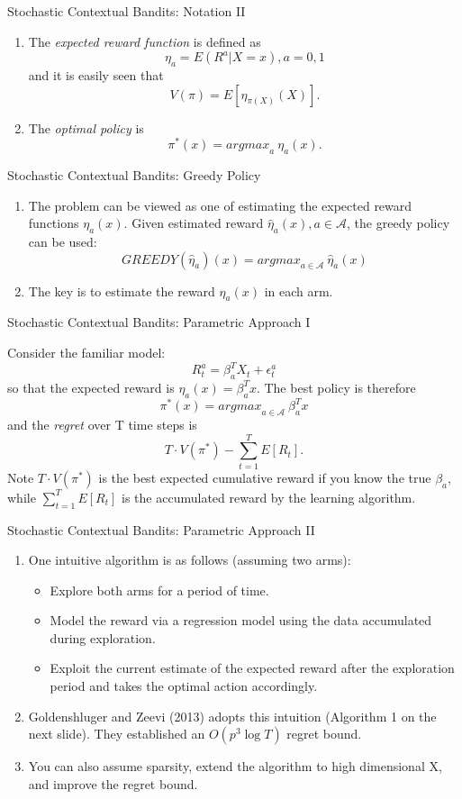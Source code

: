 \documentclass[english]{article}
\begin{document}
\item {Stochastic Contextual Bandits: Notation II}
    \begin{enumerate}
        \item The \emph{expected reward function} is defined as\[
        \eta_a = E(R^a | X = x), a = 0,1
        \] and it is easily seen that \[
        V(\pi) = E[\eta_{\pi(X)}(X)].
        \]
        
        \item
        The \emph{optimal policy} is  \[
        \pi^\ast(x) = \textit{argmax}_{a} ~\eta_a(x).
        \]
    \end{enumerate}


\item {Stochastic Contextual Bandits: Greedy Policy}
\begin{enumerate}
    \item 
    The problem can be viewed as one of estimating the expected reward functions $\eta_a(x)$. Given estimated reward $\hat{\eta}_a(x), a \in \mathcal{A}$, the greedy policy can be used: \[
    \textit{GREEDY}(\hat{\eta}_a)(x) = \textit{argmax}_{a \in \mathcal{A}} ~\hat{\eta}_a(x)
    \]
    \item 
    The key is to estimate the reward $\eta_a(x)$ in each arm.
\end{enumerate}


\item {Stochastic Contextual Bandits: Parametric Approach I}

    Consider the familiar model: \[
    R_t^a = \beta_a^T X_t + \epsilon_t^a
    \] so that the expected reward is $\eta_a(x) = \beta_a^T x$. The best policy is therefore \[
    \pi^\ast(x) = \textit{argmax}_{a \in \mathcal{A}} ~\beta_a^T x
    \] and the \emph{regret} over T time steps is \[
    T\cdot V(\pi^\ast) - \sum_{t = 1}^T E[R_t].
    \]
    Note $T\cdot V(\pi^\ast)$ is the best expected cumulative reward if you know the true $\beta_a$, while $\sum_{t = 1}^T E[R_t]$ is the accumulated reward by the learning algorithm.


\item {Stochastic Contextual Bandits: Parametric Approach II}
\begin{enumerate}
\item
    One intuitive algorithm is as follows (assuming two arms):
    \begin{itemize}
        \item Explore both arms for a period of time.
        \item Model the reward via a regression model using the data accumulated during exploration.
        \item Exploit the current estimate of the expected reward after the exploration period and takes the optimal action accordingly.
    \end{itemize}
\item Goldenshluger and Zeevi (2013) adopts this intuition (Algorithm 1 on the next slide). They established an $O(p^3 \log T)$ regret bound. 
\item You can also assume sparsity, extend the algorithm to high dimensional X, and improve the regret bound. 
\end{enumerate}
\end{document}
